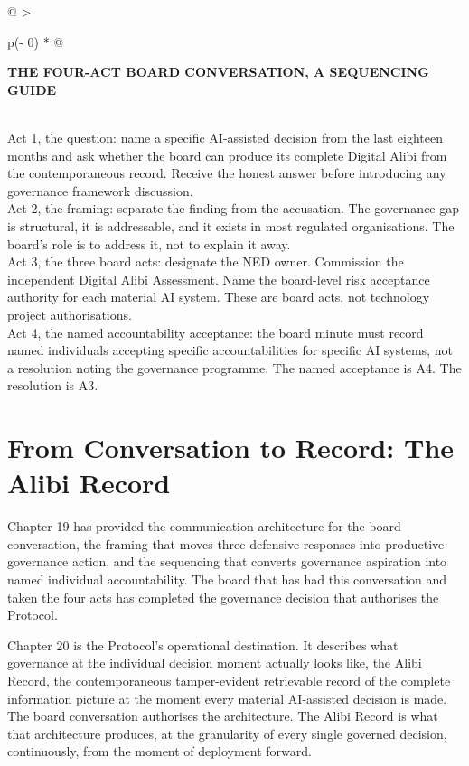 \begin{longtable}[]{@{}
  >{\raggedright\arraybackslash}p{(\columnwidth - 0\tabcolsep) * }@{}}
\toprule\noalign{}
\begin{minipage}[b]{\linewidth}\raggedright
\textbf{THE FOUR-ACT BOARD CONVERSATION, A SEQUENCING GUIDE}
\end{minipage} \\
\midrule\noalign{}
\endhead
\bottomrule\noalign{}
\endlastfoot
Act 1, the question: name a specific AI-assisted decision from the last eighteen months and ask whether the board can produce its complete Digital Alibi from the contemporaneous record. Receive the honest answer before introducing any governance framework discussion. \\
Act 2, the framing: separate the finding from the accusation. The governance gap is structural, it is addressable, and it exists in most regulated organisations. The board's role is to address it, not to explain it away. \\
Act 3, the three board acts: designate the NED owner. Commission the independent Digital Alibi Assessment. Name the board-level risk acceptance authority for each material AI system. These are board acts, not technology project authorisations. \\
Act 4, the named accountability acceptance: the board minute must record named individuals accepting specific accountabilities for specific AI systems, not a resolution noting the governance programme. The named acceptance is A4. The resolution is A3. \\
\end{longtable}

\scenebreak

\section{From Conversation to Record: The Alibi Record}

Chapter 19 has provided the communication architecture for the board conversation, the framing that moves three defensive responses into productive governance action, and the sequencing that converts governance aspiration into named individual accountability. The board that has had this conversation and taken the four acts has completed the governance decision that authorises the Protocol.

Chapter 20 is the Protocol's operational destination. It describes what governance at the individual decision moment actually looks like, the Alibi Record, the contemporaneous tamper-evident retrievable record of the complete information picture at the moment every material AI-assisted decision is made. The board conversation authorises the architecture. The Alibi Record is what that architecture produces, at the granularity of every single governed decision, continuously, from the moment of deployment forward.
